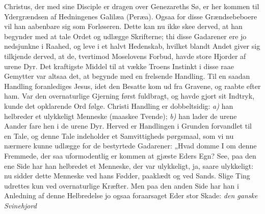 \documentclass[12pt,a4paper]{book}
\begin{document}
Christus, der med sine Disciple er dragen over Genezareths Sø, er her kommen til
Ydergrændsen af Hedningenes Galilæa (Peræa). Ogsaa for disse Grændsebeboere vil han
aabenbare sig som Forløseren. Dette kan nu ikke skee derved, at han begynder med at tale
Ordet og udlægge Skrifterne; thi disse Gadarener ere jo nedsjunkne i Raahed, og leve i et
halvt Hedenskab, hvilket blandt Andet giver sig tilkjende derved, at de, tvertimod
Moselovens Forbud, havde store Hjorder af urene Dyr. Det kraftigste Middel til at vække
Troens Instinkt i disse raae Gemytter var altsaa det, at begynde med en frelsende
Handling. Til en saadan Handling foranlediges Jesus, idet den Besatte kom ud fra Gravene,
og raabte efter ham. Var den overnaturlige Gjerning først fuldbragt, og havde gjort sit
Indtryk, kunde det opklarende Ord følge. Christi Handling er dobbeltsidig: \textit{a)} han
helbreder et ulykkeligt Menneske (maaskee Tvende); \textit{b)} han lader de urene Aander
fare hen i de urene Dyr. Herved er Handlingen i Grunden forvandlet til en Tale, og denne
Tale indeholder et Samvittigheds pørgsmaal, som vi nu nærmere kunne udlægge for de
bestyrtede Gadarener: „Hvad domme I om denne Fremmede, der saa uformodentlig er kommen at
gjæste Eders Egn? See, paa den ene Side har han helbredet et Menneske, der var ulykkeligt,
ja, saare ulykkeligt: nu sidder dette Menneske ved hans Fødder, paaklædt og ved Sands.
Slige Ting udrettes kun ved overnaturlige Kræfter. Men paa den anden Side har han i
Anledning af denne Helbredelse jo ogsaa foraarsaget Eder stor Skade: \emph{den ganske
Svinehjord}
\end{document}
